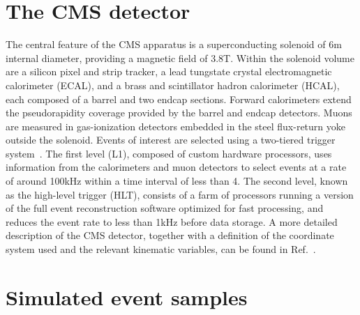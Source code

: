 
\section{The CMS detector}
\label{sec:detector}

The central feature of the CMS apparatus is a superconducting solenoid
of 6\unit{m} internal diameter, providing a magnetic field of
3.8\unit{T}. Within the solenoid volume are a silicon pixel and strip
tracker, a lead tungstate crystal electromagnetic calorimeter (ECAL),
and a brass and scintillator hadron calorimeter (HCAL), each composed
of a barrel and two endcap sections. Forward calorimeters extend the
pseudorapidity coverage provided by the barrel and endcap
detectors. Muons are measured in gas-ionization detectors embedded in
the steel flux-return yoke outside the solenoid. Events of interest
are selected using a two-tiered trigger
system~\cite{Khachatryan:2016bia}. The first level (L1), composed of
custom hardware processors, uses information from the calorimeters and
muon detectors to select events at a rate of around 100\unit{kHz}
within a time interval of less than 4\mus. The second level, known as
the high-level trigger (HLT), consists of a farm of processors running
a version of the full event reconstruction software optimized for fast
processing, and reduces the event rate to less than 1\unit{kHz} before
data storage.  A more detailed description of the CMS detector,
together with a definition of the coordinate system used and the
relevant kinematic variables, can be found in
Ref.~\cite{Chatrchyan:2008zzk}.


\section{Simulated event samples}
\label{sec:simulation}


